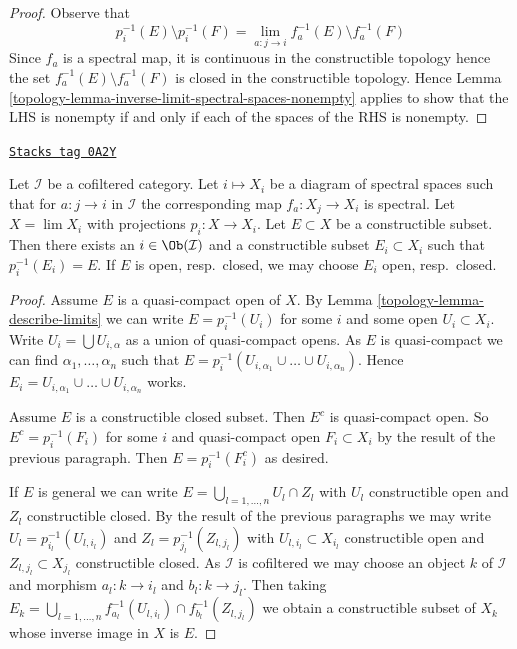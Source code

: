 \begin{proof}

Observe that
$$
p_i^{-1}(E) \setminus p_i^{-1}(F) =
\lim_{a : j \to i} f_a^{-1}(E) \setminus f_a^{-1}(F)
$$
Since $f_a$ is a spectral map, it is continuous in the constructible topology
hence the set $f_a^{-1}(E) \setminus f_a^{-1}(F)$ is closed in the
constructible topology. Hence
Lemma \ref{topology-lemma-inverse-limit-spectral-spaces-nonempty}
applies to show that the LHS is nonempty if and only if each of the spaces
of the RHS is nonempty.
\end{proof}

\begin{lemma}
\label{topology-lemma-inverse-limit-spectral-spaces-constructible}
\href{https://stacks.math.columbia.edu/tag/0A2Y}{\texttt{Stacks tag 0A2Y}}

Let $\mathcal{I}$ be a cofiltered category. Let $i \mapsto X_i$ be a diagram
of spectral spaces such that for $a : j \to i$ in $\mathcal{I}$
the corresponding map $f_a : X_j \to X_i$ is spectral. Let $X = \lim X_i$
with projections $p_i : X \to X_i$. Let $E \subset X$ be a constructible
subset. Then there exists an $i \in \Ob(\mathcal{I})$ and a constructible
subset $E_i \subset X_i$ such that $p_i^{-1}(E_i) = E$. If $E$ is open,
resp.\ closed, we may choose $E_i$ open, resp.\ closed.
\end{lemma}

\begin{proof}

Assume $E$ is a quasi-compact open of $X$. By
Lemma \ref{topology-lemma-describe-limits} we can write $E = p_i^{-1}(U_i)$
for some $i$ and some open $U_i \subset X_i$.
Write $U_i = \bigcup U_{i, \alpha}$ as a union of quasi-compact opens.
As $E$ is quasi-compact we can find $\alpha_1, \ldots, \alpha_n$
such that $E = p_i^{-1}(U_{i, \alpha_1} \cup \ldots \cup U_{i, \alpha_n})$.
Hence $E_i = U_{i, \alpha_1} \cup \ldots \cup U_{i, \alpha_n}$ works.

\medskip\noindent
Assume $E$ is a constructible closed subset. Then $E^c$ is quasi-compact
open. So $E^c = p_i^{-1}(F_i)$ for some $i$ and
quasi-compact open $F_i \subset X_i$ by the result of the previous paragraph.
Then $E = p_i^{-1}(F_i^c)$ as desired.

\medskip\noindent
If $E$ is general we can write $E = \bigcup_{l = 1, \ldots, n} U_l \cap Z_l$
with $U_l$ constructible open and $Z_l$ constructible closed. By the result
of the previous paragraphs we may write $U_l = p_{i_l}^{-1}(U_{l, i_l})$
and $Z_l = p_{j_l}^{-1}(Z_{l, j_l})$
with $U_{l, i_l} \subset X_{i_l}$ constructible open and
$Z_{l, j_l} \subset X_{j_l}$ constructible closed. As $\mathcal{I}$ is
cofiltered we may choose an object $k$ of $\mathcal{I}$ and morphism
$a_l : k \to i_l$ and $b_l : k \to j_l$. Then taking
$E_k = \bigcup_{l = 1, \ldots, n}
f_{a_l}^{-1}(U_{l, i_l}) \cap f_{b_l}^{-1}(Z_{l, j_l})$
we obtain a constructible subset of $X_k$ whose inverse image in $X$ is $E$.
\end{proof}

